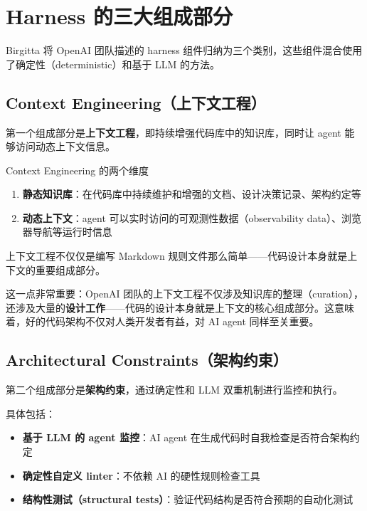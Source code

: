 \section{Harness 的三大组成部分}

Birgitta 将 OpenAI 团队描述的 harness 组件归纳为三个类别，这些组件混合使用了确定性（deterministic）和基于 LLM 的方法。

\subsection{Context Engineering（上下文工程）}

第一个组成部分是\textbf{上下文工程}，即持续增强代码库中的知识库，同时让 agent 能够访问动态上下文信息。

\begin{importantbox}{Context Engineering 的两个维度}
\begin{enumerate}[leftmargin=1.5em]
    \item \textbf{静态知识库}：在代码库中持续维护和增强的文档、设计决策记录、架构约定等
    \item \textbf{动态上下文}：agent 可以实时访问的可观测性数据（observability data）、浏览器导航等运行时信息
\end{enumerate}
上下文工程不仅仅是编写 Markdown 规则文件那么简单------代码设计本身就是上下文的重要组成部分。
\end{importantbox}

这一点非常重要：OpenAI 团队的上下文工程不仅涉及知识库的整理（curation），还涉及大量的\textbf{设计工作}------代码的设计本身就是上下文的核心组成部分。这意味着，好的代码架构不仅对人类开发者有益，对 AI agent 同样至关重要。

\subsection{Architectural Constraints（架构约束）}

第二个组成部分是\textbf{架构约束}，通过确定性和 LLM 双重机制进行监控和执行。

具体包括：
\begin{itemize}[leftmargin=1.5em]
    \item \textbf{基于 LLM 的 agent 监控}：AI agent 在生成代码时自我检查是否符合架构约定
    \item \textbf{确定性自定义 linter}：不依赖 AI 的硬性规则检查工具
    \item \textbf{结构性测试（structural tests）}：验证代码结构是否符合预期的自动化测试
\end{itemize}

